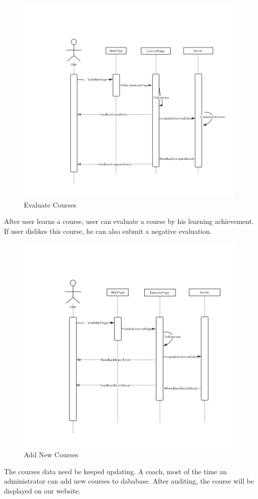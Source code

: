 \documentclass[16pt]{scrreprt}
\begin{document}
\begin{figure}[H]
    \includegraphics[width=\linewidth]{./FuncPhoto/17.png}   
    \caption{Evaluate Courses}
\end{figure}
After user learns a course, user can evaluate a course by his learning achievement. If user dislikes this course, he can also submit a negative evaluation.

\begin{figure}[H]
    \includegraphics[width=\linewidth]{./FuncPhoto/18.png}   
    \caption{Add New Courses}
\end{figure}
The courses data need be keeped updating. A coach, most of the time an administrator can add new courses to dababase. After auditing, the course will be displayed on our website. 
 
\end{document}
